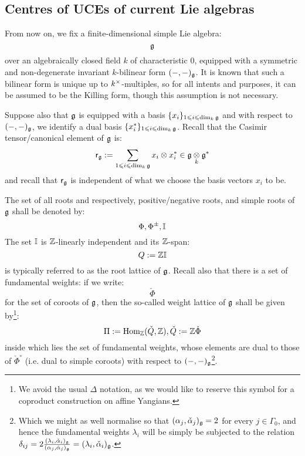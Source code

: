     \subsection{Centres of UCEs of current Lie algebras}
        \begin{convention} \label{conv: a_fixed_finite_dimensional_simple_lie_algebra}
            From now on, we fix a finite-dimensional simple Lie algebra:
                $$\mathfrak{g}$$
            over an algebraically closed field $k$ of characteristic $0$, equipped with a symmetric and non-degenerate invariant $k$-bilinear form $(-, -)_{\mathfrak{g}}$. It is known that such a bilinear form is unique up to $k^{\x}$-multiples, so for all intents and purposes, it can be assumed to be the Killing form, though this assumption is not necessary. 
    
            Suppose also that $\mathfrak{g}$ is equipped with a basis $\{x_i\}_{1 \leqslant i \leqslant \dim_k \mathfrak{g}}$ and with respect to $(-, -)_{\mathfrak{g}}$, we identify a dual basis $\{x_i^*\}_{1 \leqslant i \leqslant \dim_k \mathfrak{g}}$. Recall that the Casimir tensor/canonical element of $\mathfrak{g}$ is:
                $$\sfr_{\g} := \sum_{1 \leq i \leq \dim_k \g} x_i \tensor x_i^* \in \g \tensor_k \g^*$$
            and recall that $\mathsf{r}_{\mathfrak{g}}$ is independent of what we choose the basis vectors $x_i$ to be.
    
            The set of all roots and respectively, positive/negative roots, and simple roots of $\mathfrak{g}$ shall be denoted by:
                $$\Phi, \Phi^{\pm}, \mathbb{I}$$
            The set $\mathbb{I}$ is $\mathbb{Z}$-linearly independent and its $\mathbb{Z}$-span:
                $$Q := \mathbb{Z} \mathbb{I}$$
            is typically referred to as the root lattice of $\mathfrak{g}$. Recall also that there is a set of fundamental weights: if we write:
                $$\check{\Phi}$$
            for the set of coroots of $\mathfrak{g}$, then the so-called weight lattice of $\mathfrak{g}$ shall be given by\footnote{We avoid the usual $\Delta$ notation, as we would like to reserve this symbol for a coproduct construction on affine Yangians.}:
                $$\Pi := \mathrm{Hom}_{\mathbb{Z}}(\check{Q}, \mathbb{Z}), \check{Q} := \mathbb{Z}\check{\Phi}$$
            inside which lies the set of fundamental weights, whose elements are dual to those of $\check{\Phi}^{\circ}$ (i.e. dual to simple coroots) with respect to $(-, -)_{\mathfrak{g}}$\footnote{Which we might as well normalise so that $(\alpha_j, \check{\alpha}_j)_{\mathfrak{g}} = 2$ for every $j \in \Gamma_0$, and hence the fundamental weights $\lambda_i$ will be simply be subjected to the relation $\delta_{ij} = 2 \frac{(\lambda_i, \check{\alpha}_i)_{\mathfrak{g}}}{(\alpha_j, \check{\alpha}_j)_{\mathfrak{g}}} = (\lambda_i, \check{\alpha}_i)_{\mathfrak{g}}$.}.
        \end{convention}

